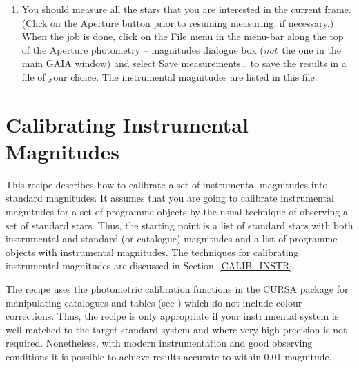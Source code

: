 \documentclass[twoside,11pt,nolof]{starlink}
\begin{document}
\begin{enumerate}
  \item You should measure all the stars that you are interested in
   the current frame.  (Click on the \textsf{Aperture} button prior to
   resuming measuring, if necessary.)  When the job is done, click on the
   \textsf{File} menu in the menu-bar along the top of the \textsf{Aperture
   photometry -- magnitudes} dialogue box (\textit{not}\, the one in the
   main GAIA window) and select \textsf{Save measurements\ldots} to save the
   results in a file of your choice.  The instrumental magnitudes are
   listed in this file.

\end{enumerate}


\newpage
\section{\label{CALIBRATE_RECIP}Calibrating
Instrumental Magnitudes}

This recipe describes how to calibrate a set of instrumental magnitudes
into standard magnitudes.  It assumes that you are going to calibrate
instrumental magnitudes for a set of programme objects by the usual
technique of observing a set of standard stars.  Thus, the starting
point is a list of standard stars with both instrumental and
standard (or catalogue) magnitudes and a list of programme objects
with instrumental magnitudes.  The techniques for calibrating
instrumental magnitudes are discussed in Section~\ref{CALIB_INSTR}.

The recipe uses the photometric calibration functions in the CURSA
package for manipulating catalogues and tables (see
\cite{SUN190}) which do not include colour
corrections.  Thus, the recipe is only appropriate if your instrumental
system is well-matched to the target standard system and where very high
precision is not required.  Nonetheless, with modern instrumentation and
good observing conditions it is possible to achieve results accurate to
within 0.01 magnitude.
\end{document}
